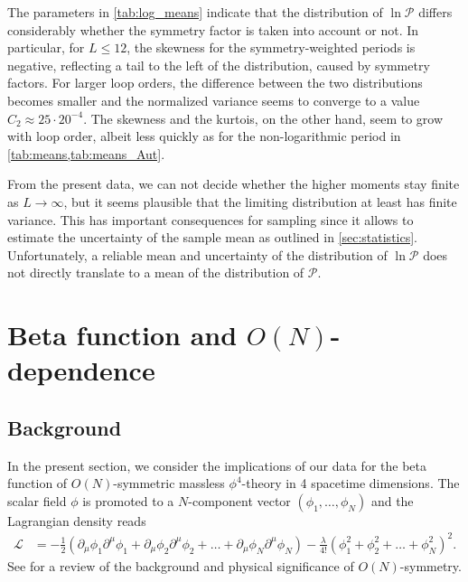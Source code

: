 \documentclass[12pt,a4paper]{article}
\newcommand{\period}{\mathcal P}
\renewcommand{\|}{\rule[-0.4ex]{0.2ex}{1.2em}}
\begin{document}
The parameters in \cref{tab:log_means} indicate that  the distribution of $\ln \period$ differs considerably whether the symmetry factor is taken into account or not. In particular, for $L\leq 12$, the skewness for the symmetry-weighted periods is negative, reflecting a tail to the left of the distribution, caused by symmetry factors. For larger loop orders, the difference between the two distributions becomes smaller and the normalized variance seems to converge to a value $C_2 \approx 25 \cdot 20^{-4}$. The skewness and the kurtois, on the other hand, seem to grow with loop order, albeit less quickly as for the non-logarithmic period in \cref{tab:means,tab:means_Aut}. 

From the present data, we can not decide whether the higher moments stay finite as $L\rightarrow\infty$, but it seems plausible that the limiting distribution at least has finite variance. This has important consequences for sampling since it allows to estimate the uncertainty of the sample mean as outlined in \cref{sec:statistics}. Unfortunately, a reliable mean and uncertainty of the distribution of $\ln \period$ does not directly translate to a mean of the distribution of $\period$. 










\FloatBarrier




\section[Beta function and O(N)-dependence]{Beta function and $O(N)$-dependence}\label{sec:beta}


\subsection{Background}\label{sec:beta_background}




In the present section, we consider the implications of our data for the beta function of $O(N)$-symmetric massless $\phi^4$-theory in 4 spacetime dimensions. The scalar field $\phi$ is promoted to a $N$-component vector $(\phi_1, \ldots, \phi_N)$ and the Lagrangian density reads
\begin{align}\label{lagrangian_phi4}
\mathcal L &= -\frac 12 \left( \partial_\mu \phi_1 \partial^\mu \phi_1 + \partial_\mu \phi_2 \partial^\mu \phi_2 + \ldots + \partial_\mu \phi_N \partial^\mu \phi_N \right)- \frac{\lambda}{4!} \left( \phi_1^2 + \phi_2^2 + \ldots + \phi_N^2 \right) ^2.
\end{align}
See \cite{pelissetto_critical_2002} for a review of the background and physical significance of $O(N)$-symmetry.
\end{document}
